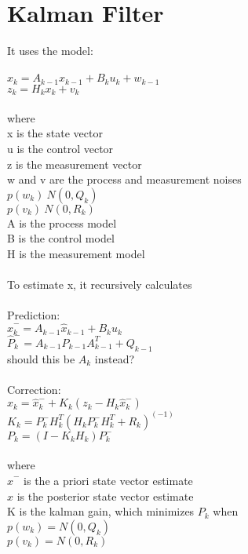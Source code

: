 \documentclass[a4paper,10pt]{report}
\begin{document}
\section{Kalman Filter}
It uses the model: \\
 \\
  $x_k = A_{k-1} x_{k-1} + B_k u_k + w_{k-1}$ \\
  $z_k = H_k x_k + v_k$ \\
 \\
where \\
  x is the state vector \\
  u is the control vector \\
  z is the measurement vector \\
  w and v are the process and measurement noises \\
    $p(w_k) ~ N(0,Q_k)$ \\
    $p(v_k) ~ N(0,R_k)$ \\
  A is the process model \\
  B is the control model \\
  H is the measurement model \\
 \\
To estimate x, it recursively calculates \\
 \\
Prediction: \\
  $\hat{x}^-_k = A_{k-1} \hat{x}_{k-1} + B_k u_k$ \\
  $\hat{P}^-_k = A_{k-1} P_{k-1} A^T_{k-1}  +  Q_{k-1}$  \\
    should this be $A_k$ instead? \\
 \\
Correction: \\
  $\hat{x}_k  =  \hat{x}^-_k + K_k ( z_k - H_k \hat{x}^-_k )$ \\
  $K_k = P^-_k H^T_k ( H_k P^-_k H^T_k + R_k )^(-1)$ \\
  $P_k = ( I - K_k H_k ) P^-_k$ \\
 \\
where \\
  $\hat{x}^-$ is the a priori state vector estimate \\
  $\hat{x}$ is the posterior state vector estimate \\
  K is the kalman gain, which minimizes $P_k$ when \\
    $p(w_k) = N(0,Q_k)$ \\
    $p(v_k) = N(0,R_k)$ \\
\end{document}
